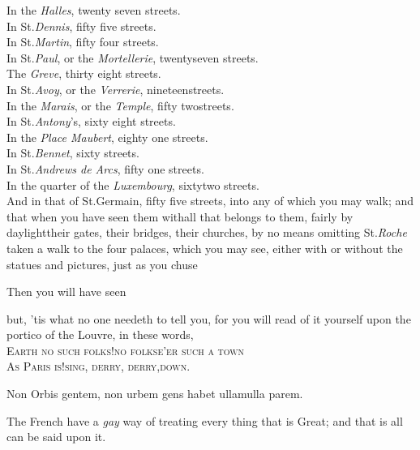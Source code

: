 \documentclass{article}
\begin{document}
\newpage\noindent
In the \textit{Halles}, twenty seven streets.\\
In St.\@ \textit{Dennis}, fifty five streets.\\
In St.\@ \textit{Martin}, fifty four streets.\\
In St.\@ \textit{Paul}, or the \textit{Mortellerie}, twenty\bnq seven streets.\\
The \textit{Greve}, thirty eight streets.\\
In St.\@ \textit{Avoy}, or the \textit{Verrerie}, nineteen\bnq streets.\\
In the \textit{Marais}, or the \textit{Temple}, fifty two\bnq streets.\\
In St.\@ \textit{Antony}’s, sixty eight streets.\\
In the \textit{Place Maubert}, eighty one streets.\\
In St.\@ \textit{Bennet}, sixty streets.\\
In St.\@ \textit{Andrews de Arcs}, fifty one streets.\\
In the quarter of the \textit{Luxembourg}, sixty\bnq two streets.\\[2pt]
And in that of St.\@ Germain, fifty five streets, into any of
which you may walk; and that when you have seen them with\pb all that
belongs to them, fairly by daylight\tsk their gates, their
bridges, their \break
{}\break
churches, by no means omitting
St.\@ \textit{Roche}\break
{}
taken a walk to the four palaces, which you may see, either with or
without the statues and pictures, just as you chuse\tsk

\tsh Then you will have seen\tsh

\tsh but, ’tis what no one needeth to tell you,
for you will read of it yourself upon the portico of the
Louvre, in these words,\\[3pt]
\lower-3pt\hbox{\ast} \textsc{Earth no such folks!\tsk no folks\bnq\quad e’er such a
town}\\[2pt]
\textsc{As Paris is!\tsk sing, derry, derry,\bnq\quad down}.

\bgroup\footnotesize
\noindent\lower-3pt\hbox{\ast} Non Orbis gentem, non urbem gens habet
ullam\bnq\qquad\tsh\tsh\tsh\tsh ulla parem.
\par\egroup
\newpage
\noindent
The French have a \textit{gay} way of treating every thing
that is Great; and that is all can be said upon it.
\end{document}
